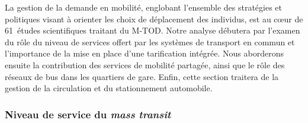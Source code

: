 \begin{refsegment}
La gestion de la demande en mobilité, englobant l'ensemble des stratégies et politiques visant à orienter les choix de déplacement des individus, est au cœur de 61~études scientifiques traitant du \acrshort{M-TOD}. Notre analyse débutera par l'examen du rôle du niveau de services offert par les systèmes de transport en commun et l'importance de la mise en place d'une tarification intégrée. Nous aborderons ensuite la contribution des services de mobilité partagée, ainsi que le rôle des réseaux de bus dans les quartiers de gare. Enfin, cette section traitera de la gestion de la circulation et du stationnement automobile.%

\subsubsection*{Niveau de service du \textsl{mass transit}
    \label{chap2:niveau-service}
    }
    

\end{refsegment}
